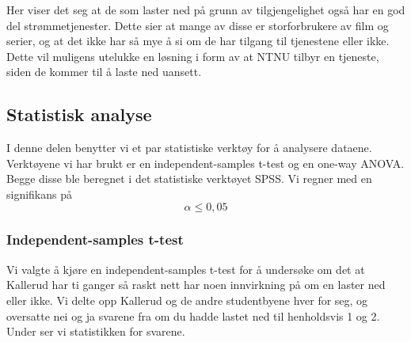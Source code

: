 Her viser det seg at de som laster ned på grunn av tilgjengelighet også har en god del strømmetjenester. Dette sier at mange av disse er storforbrukere av film og serier, og at det ikke har så mye å si om de har tilgang til tjenestene eller ikke. Dette vil muligens utelukke en løsning i form av at NTNU tilbyr en tjeneste, siden de kommer til å laste ned uansett.

\subsection{Statistisk analyse}
I denne delen benytter vi et par statistiske verktøy for å analysere dataene. Verktøyene vi har brukt er en independent-samples t-test og en one-way ANOVA. Begge disse ble beregnet i det statistiske verktøyet SPSS. Vi regner med en signifikans på \[\alpha \le 0,05\]

\subsubsection{Independent-samples t-test}
Vi valgte å kjøre en independent-samples t-test for å undersøke om det at Kallerud har ti ganger så raskt nett har noen innvirkning på om en laster ned eller ikke. Vi delte opp Kallerud og de andre studentbyene hver for seg, og oversatte nei og ja svarene fra om du hadde lastet ned til henholdsvis 1 og 2. Under ser vi statistikken for svarene. 

